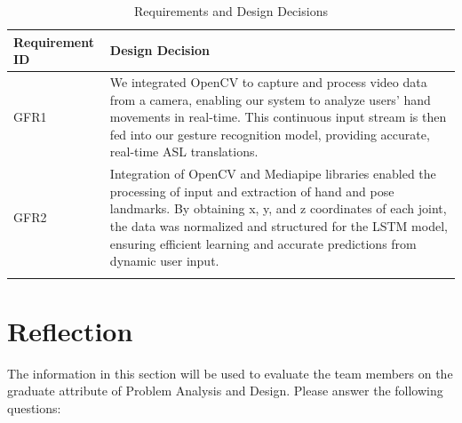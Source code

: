 \documentclass[12pt, titlepage]{article}
\begin{document}
\renewcommand{\arraystretch}{1.2}
\noindent \begin{longtable}{p{}|p{}}
\hline
\textbf{Requirement ID} & \textbf{Design Decision}\\
\hline
GFR1
& We integrated OpenCV to capture and process video data from a camera, enabling our system to analyze users' hand movements in real-time. This continuous input stream is then fed into our gesture recognition model, providing accurate, real-time ASL translations.\\
\hline
GFR2
& Integration of OpenCV and Mediapipe libraries enabled the processing of input and extraction of hand and pose landmarks. By obtaining x, y, and z coordinates of each joint, the data was normalized and structured for the LSTM model, ensuring efficient learning and accurate predictions from dynamic user input.\\
\hline
\caption{Requirements and Design Decisions}
\end{longtable}

% 

\newpage{}

\appendix





\section{Reflection}

The information in this section will be used to evaluate the team members on the
graduate attribute of Problem Analysis and Design.  Please answer the following questions:
\end{document}
